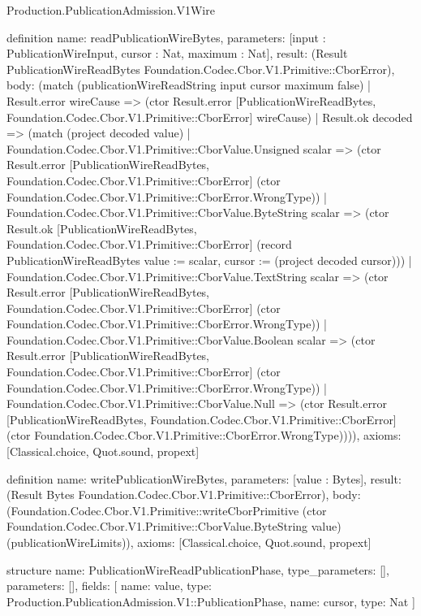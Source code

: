 \begin{lexlean}{Production.PublicationAdmission.V1Wire}
\begin{semanticmodule}
definition{
  name: readPublicationWireBytes,
  parameters: [input : PublicationWireInput, cursor : Nat, maximum : Nat],
  result: (Result PublicationWireReadBytes Foundation.Codec.Cbor.V1.Primitive::CborError),
  body: (match (publicationWireReadString input cursor maximum false)
    | Result.error wireCause => (ctor Result.error [PublicationWireReadBytes, Foundation.Codec.Cbor.V1.Primitive::CborError] wireCause)
    | Result.ok decoded => (match (project decoded value)
      | Foundation.Codec.Cbor.V1.Primitive::CborValue.Unsigned scalar => (ctor Result.error [PublicationWireReadBytes, Foundation.Codec.Cbor.V1.Primitive::CborError] (ctor Foundation.Codec.Cbor.V1.Primitive::CborError.WrongType))
      | Foundation.Codec.Cbor.V1.Primitive::CborValue.ByteString scalar => (ctor Result.ok [PublicationWireReadBytes, Foundation.Codec.Cbor.V1.Primitive::CborError] (record PublicationWireReadBytes {value := scalar, cursor := (project decoded cursor)}))
      | Foundation.Codec.Cbor.V1.Primitive::CborValue.TextString scalar => (ctor Result.error [PublicationWireReadBytes, Foundation.Codec.Cbor.V1.Primitive::CborError] (ctor Foundation.Codec.Cbor.V1.Primitive::CborError.WrongType))
      | Foundation.Codec.Cbor.V1.Primitive::CborValue.Boolean scalar => (ctor Result.error [PublicationWireReadBytes, Foundation.Codec.Cbor.V1.Primitive::CborError] (ctor Foundation.Codec.Cbor.V1.Primitive::CborError.WrongType))
      | Foundation.Codec.Cbor.V1.Primitive::CborValue.Null => (ctor Result.error [PublicationWireReadBytes, Foundation.Codec.Cbor.V1.Primitive::CborError] (ctor Foundation.Codec.Cbor.V1.Primitive::CborError.WrongType)))),
  axioms: [Classical.choice, Quot.sound, propext]
}

definition{
  name: writePublicationWireBytes,
  parameters: [value : Bytes],
  result: (Result Bytes Foundation.Codec.Cbor.V1.Primitive::CborError),
  body: (Foundation.Codec.Cbor.V1.Primitive::writeCborPrimitive (ctor Foundation.Codec.Cbor.V1.Primitive::CborValue.ByteString value) (publicationWireLimits)),
  axioms: [Classical.choice, Quot.sound, propext]
}

structure{
  name: PublicationWireReadPublicationPhase,
  type_parameters: [],
  parameters: [],
  fields: [
    {name: value, type: Production.PublicationAdmission.V1::PublicationPhase},
    {name: cursor, type: Nat}
  ]
}


\end{semanticmodule}
\end{lexlean}
